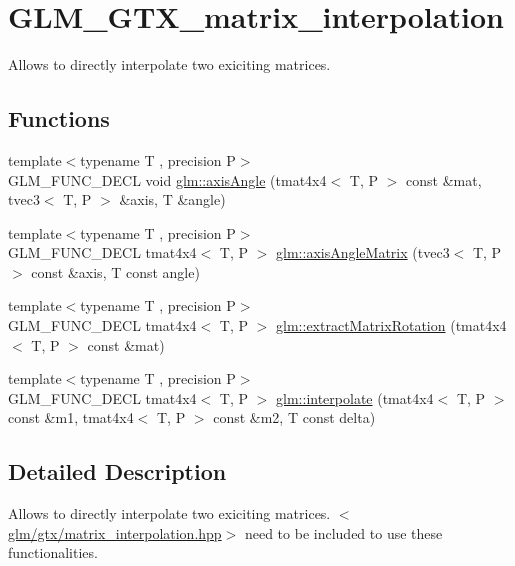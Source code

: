 \hypertarget{group__gtx__matrix__interpolation}{\section{G\-L\-M\-\_\-\-G\-T\-X\-\_\-matrix\-\_\-interpolation}
\label{group__gtx__matrix__interpolation}
}


Allows to directly interpolate two exiciting matrices.  


\subsection*{Functions}
\begin{DoxyCompactItemize}
\item 
{\footnotesize template$<$typename T , precision P$>$ }\\G\-L\-M\-\_\-\-F\-U\-N\-C\-\_\-\-D\-E\-C\-L void \hyperlink{group__gtx__matrix__interpolation_ga9aef292eb5f29bdbb58a53ef4281af92}{glm\-::axis\-Angle} (tmat4x4$<$ T, P $>$ const \&mat, tvec3$<$ T, P $>$ \&axis, T \&angle)
\item 
{\footnotesize template$<$typename T , precision P$>$ }\\G\-L\-M\-\_\-\-F\-U\-N\-C\-\_\-\-D\-E\-C\-L tmat4x4$<$ T, P $>$ \hyperlink{group__gtx__matrix__interpolation_ga82d4bc058e9628cb2ea1d4e117a0cf39}{glm\-::axis\-Angle\-Matrix} (tvec3$<$ T, P $>$ const \&axis, T const angle)
\item 
{\footnotesize template$<$typename T , precision P$>$ }\\G\-L\-M\-\_\-\-F\-U\-N\-C\-\_\-\-D\-E\-C\-L tmat4x4$<$ T, P $>$ \hyperlink{group__gtx__matrix__interpolation_ga6b8170aa4cf43caf81400696ebb38afe}{glm\-::extract\-Matrix\-Rotation} (tmat4x4$<$ T, P $>$ const \&mat)
\item 
{\footnotesize template$<$typename T , precision P$>$ }\\G\-L\-M\-\_\-\-F\-U\-N\-C\-\_\-\-D\-E\-C\-L tmat4x4$<$ T, P $>$ \hyperlink{group__gtx__matrix__interpolation_ga45099a92c5c704503565619ac2bcd5c6}{glm\-::interpolate} (tmat4x4$<$ T, P $>$ const \&m1, tmat4x4$<$ T, P $>$ const \&m2, T const delta)
\end{DoxyCompactItemize}


\subsection{Detailed Description}
Allows to directly interpolate two exiciting matrices. $<$\hyperlink{matrix__interpolation_8hpp}{glm/gtx/matrix\-\_\-interpolation.\-hpp}$>$ need to be included to use these functionalities. 

